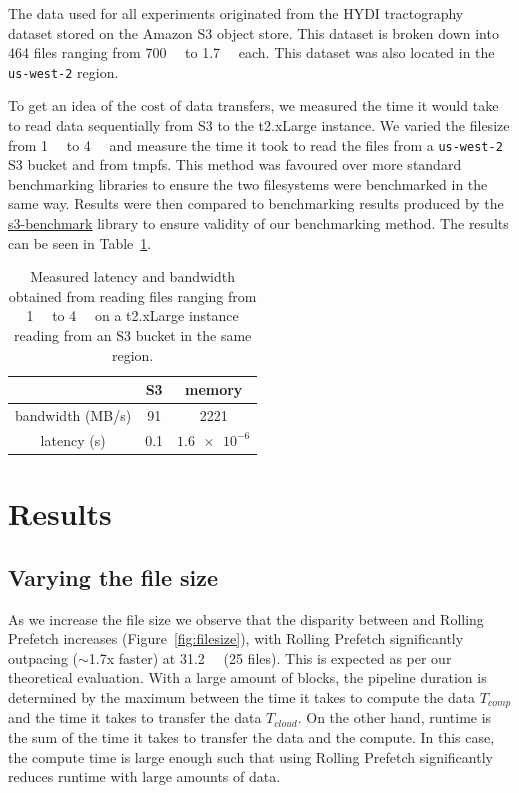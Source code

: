 \documentclass[conference]{IEEEtran}
\begin{document}
The data used for all experiments originated from the HYDI tractography dataset stored on the Amazon S3 object store. 
This dataset is broken down into 464 files ranging from \SI{700}{\mebi\byte} to \SI{1.7}{\gibi\byte} each. This dataset
was also located in the \texttt{us-west-2} region.

To get an idea of the cost of data transfers, we measured the time it would take to read data sequentially from S3 to the t2.xLarge instance. We varied the filesize from \SI{1}{\kibi\byte} to \SI{4}{\gibi\byte} and measure the time it took to read the files from
a \texttt{us-west-2} S3 bucket and from tmpfs. This method was favoured over more standard benchmarking libraries to ensure the
two filesystems were benchmarked in the same way. Results were then compared to benchmarking results produced by
the \href{https://github.com/dvassallo/s3-benchmark}{s3-benchmark} library to ensure validity of our benchmarking
method. The results can be seen in Table~\ref{table:benchmarks}.


\begin{table}
\caption{Measured latency and bandwidth obtained from reading files ranging from \SI{1}{\kibi\byte} to \SI{4}{\gibi\byte} on a t2.xLarge instance reading from an S3 bucket in the same region.}
\centering
\begin{tabular}{| c | c | c| }
\cline{2-3}
  \multicolumn{1}{c|}{}& S3 & memory \\ 
  \hline
 bandwidth (MB/s) & 91 & 2221 \\  
 latency (s) & 0.1 & $\num{1.6e-6}$ \\
 \hline
\end{tabular}

\label{table:benchmarks}
\end{table}


\section{Results}
\subsection{Varying the file size}
As we increase the file size we observe that the disparity between \sfs and
Rolling Prefetch increases (Figure~\ref{fig:filesize}), with Rolling Prefetch significantly outpacing ($\sim$1.7x faster) 
\sfs at \SI{31.2}{\gibi\byte} (25 files). This is expected as per our theoretical evaluation. With a large amount of blocks, the pipeline duration is determined by the maximum between the time it takes to
compute the data $T_{comp}$ and the time it takes to transfer the data $T_{cloud}$. On the other hand, \sfs runtime is the sum of the time it takes to transfer the data and the compute. In this case, the compute time is large enough such that using Rolling Prefetch significantly reduces runtime with large amounts of data.
\end{document}
